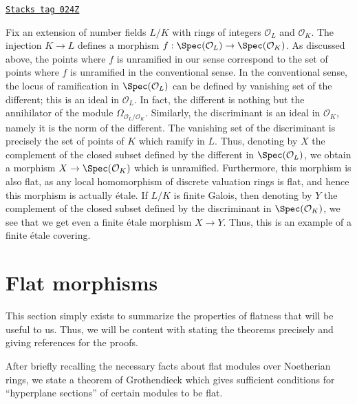 \begin{example}
\label{etale-example-number-theory-etale}
\href{https://stacks.math.columbia.edu/tag/024Z}{\texttt{Stacks tag 024Z}}

Fix an extension of number fields $L/K$ with rings of integers
$\mathcal{O}_L$ and $\mathcal{O}_K$. The injection $K \to L$ defines a
morphism $f : \Spec(\mathcal{O}_L) \to \Spec(\mathcal{O}_K)$.
As discussed above, the points where $f$ is unramified in our sense
correspond to the set of points where $f$ is unramified in the conventional
sense. In the conventional sense, the locus of ramification in
$\Spec(\mathcal{O}_L)$ can be defined by vanishing set of the
different; this is an ideal in $\mathcal{O}_L$. In fact, the different is
nothing but the annihilator of the module
$\Omega_{\mathcal{O}_L/\mathcal{O}_K}$. Similarly, the
discriminant is an ideal in $\mathcal{O}_K$, namely it is the
norm of the different.
The vanishing set of the discriminant is precisely the set
of points of $K$ which ramify in $L$.
Thus, denoting by $X$ the complement of the closed subset
defined by the different in $\Spec(\mathcal{O}_L)$,
we obtain a morphism $X \to \Spec(\mathcal{O}_K)$ which is unramified.
Furthermore, this morphism is also flat, as any local homomorphism
of discrete valuation rings is flat, and hence this morphism is
actually \'etale. If $L/K$ is finite Galois, then denoting by
$Y$ the complement of the closed subset defined by the discriminant in
$\Spec(\mathcal{O}_K)$, we see that we get even a
finite \'etale morphism $X \to Y$.
Thus, this is an example of a finite \'etale covering.
\end{example}

\section{Flat morphisms}
\label{etale-section-flat-morphisms}
This section simply exists to summarize the properties of flatness that will
be useful to us. Thus, we will be content with stating the theorems precisely
and giving references for the proofs.

\medskip\noindent
After briefly recalling the necessary facts about flat modules over Noetherian
rings, we state a theorem of Grothendieck which gives sufficient conditions
for ``hyperplane sections'' of certain modules to be flat.

